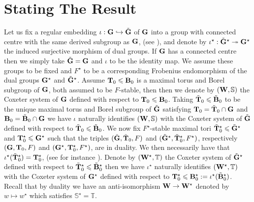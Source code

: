 \documentclass[eqthmnum]{jt-calcs}
\begin{document}
\section{Stating The Result}\label{sec:state-result}
\begin{pa}
Let us fix a regular embedding $\iota : \mathbf{G} \hookrightarrow \tilde{\mathbf{G}}$ of $\mathbf{G}$ into a group with connected centre with the same derived subgroup as $\mathbf{G}$, (see \cite[\S7]{lusztig:1988:reductive-groups-with-a-disconnected-centre}), and denote by $\iota^{\star} : \tilde{\mathbf{G}}^{\star} \twoheadrightarrow \mathbf{G}^{\star}$ the induced surjective morphism of dual groups. If $\mathbf{G}$ has a connected centre then we simply take $\tilde{\mathbf{G}} = \mathbf{G}$ and $\iota$ to be the identity map. We assume these groups to be fixed and $F^{\star}$ to be a corresponding Frobenius endomorphism of the dual groups $\mathbf{G}^{\star}$ and $\tilde{\mathbf{G}}^{\star}$. Assume $\mathbf{T}_0 \leqslant \mathbf{B}_0$ is a maximal torus and Borel subgroup of $\mathbf{G}$, both assumed to be $F$-stable, then then we denote by $(\mathbf{W},\mathbb{S})$ the Coxeter system of $\mathbf{G}$ defined with respect to $\mathbf{T}_0\leqslant \mathbf{B}_0$. Taking $\tilde{\mathbf{T}}_0 \leqslant \tilde{\mathbf{B}}_0$ to be the unique maximal torus and Borel subgroup of $\tilde{\mathbf{G}}$ satisfying $\mathbf{T}_0 = \tilde{\mathbf{T}}_0 \cap \mathbf{G}$ and $\mathbf{B}_0 = \tilde{\mathbf{B}}_0 \cap \mathbf{G}$ we have $\iota$ naturally identifies $(\mathbf{W},\mathbb{S})$ with the Coxeter system of $\tilde{\mathbf{G}}$ defined with respect to $\tilde{\mathbf{T}}_0 \leqslant \tilde{\mathbf{B}}_0$. We now fix $F^{\star}$-stable maximal tori $\tilde{\mathbf{T}}_0^{\star} \leqslant \tilde{\mathbf{G}}^{\star}$ and $\mathbf{T}_0^{\star} \leqslant \mathbf{G}^{\star}$ such that the triples $(\tilde{\mathbf{G}},\tilde{\mathbf{T}}_0,F)$ and $(\tilde{\mathbf{G}}^{\star},\tilde{\mathbf{T}}_0^{\star},F^{\star})$, respectively $(\mathbf{G},\mathbf{T}_0,F)$ and $(\mathbf{G}^{\star},\mathbf{T}_0^{\star},F^{\star})$, are in duality. We then necessarily have that $\iota^{\star}(\tilde{\mathbf{T}}_0^{\star}) = \mathbf{T}_0^{\star}$, (see for instance \cite[Lemma 1.71]{taylor:2012:thesis}). Denote by $(\mathbf{W}^{\star},\mathbb{T})$ the Coxeter system of $\tilde{\mathbf{G}}^{\star}$ defined with respect to $\tilde{\mathbf{T}}_0^{\star} \leqslant \tilde{\mathbf{B}}_0^{\star}$ then we have $\iota^{\star}$ naturally identifies $(\mathbf{W}^{\star},\mathbb{T})$ with the Coxeter system of $\mathbf{G}^{\star}$ defined with respect to $\mathbf{T}_0^{\star}\leqslant \mathbf{B}_0^{\star} := \iota^{\star}(\tilde{\mathbf{B}}_0^{\star})$. Recall that by duality we have an anti-isomorphism $\mathbf{W} \to \mathbf{W}^{\star}$ denoted by $w \mapsto w^{\star}$ which satisfies $\mathbb{S}^{\star} = \mathbb{T}$.
\end{pa}
\end{document}
